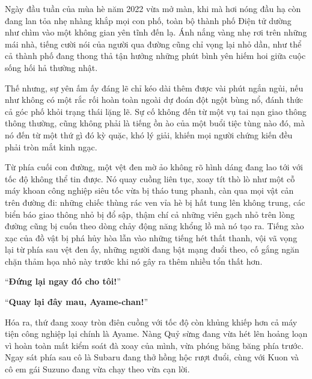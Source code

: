 \documentclass[../main.tex]{subfiles}
\begin{document}
\color{black}


Ngày đầu tuần của mùa hè năm 2022 vừa mở màn, khi mà hơi nóng đầu hạ còn đang lan tỏa nhẹ nhàng khắp mọi con phố, toàn bộ thành phố Điện tử dường như chìm vào một không gian yên tĩnh đến lạ. Ánh nắng vàng nhẹ rơi trên những mái nhà, tiếng cười nói của người qua đường cũng chỉ vọng lại nhỏ dần, như thể cả thành phố đang thong thả tận hưởng những phút bình yên hiếm hoi giữa cuộc sống hối hả thường nhật.

Thế nhưng, sự yên ấm ấy đáng lẽ chỉ kéo dài thêm được vài phút ngắn ngủi, nếu như không có một rắc rối hoàn toàn ngoài dự đoán đột ngột bùng nổ, đánh thức cả góc phố khỏi trạng thái lặng lẽ. Sự cố không đến từ một vụ tai nạn giao thông thông thường, cũng không phải là tiếng ồn ào của một buổi tiệc tùng nào đó, mà nó đến từ một thứ gì đó kỳ quặc, khó lý giải, khiến mọi người chứng kiến đều phải tròn mắt kinh ngạc.

Từ phía cuối con đường, một vệt đen mờ ảo không rõ hình dáng đang lao tới với tốc độ không thể tin được. Nó quay cuồng liên tục, xoay tít thò lò như một cỗ máy khoan công nghiệp siêu tốc vừa bị tháo tung phanh, càn qua mọi vật cản trên đường đi: những chiếc thùng rác ven vỉa hè bị hất tung lên không trung, các biển báo giao thông nhỏ bị đổ sập, thậm chí cả những viên gạch nhỏ trên lòng đường cũng bị cuốn theo dòng chảy động năng khổng lồ mà nó tạo ra. Tiếng xào xạc của đồ vật bị phá hủy hòa lẫn vào những tiếng hét thất thanh, vội vã vọng lại từ phía sau vệt đen ấy, những người đang bật mạng đuổi theo, cố gắng ngăn chặn thảm họa nhỏ này trước khi nó gây ra thêm nhiều tổn thất hơn.

``\textbf{Đứng lại ngay đó cho tôi!}''

``\textbf{Quay lại đây mau, Ayame-chan!}''

Hóa ra, thứ đang xoay tròn điên cuồng với tốc độ còn khủng khiếp hơn cả máy tiện công nghiệp lại chính là Ayame. Nàng Quỷ sừng đang vừa hét lên hoảng loạn vì hoàn toàn mất kiểm soát đà xoay của mình, vừa phóng băng băng phía trước. Ngay sát phía sau cô là Subaru đang thở hồng hộc rượt đuổi, cùng với Kuon và cô em gái Suzuno đang vừa chạy theo vừa cạn lời.
\end{document}
